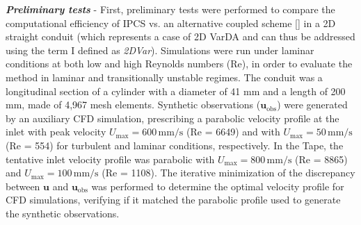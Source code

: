 \label{sec:bench}
\textbf{\textit{Preliminary tests}} - 
First, preliminary tests were performed to compare the computational efficiency of IPCS vs. an alternative coupled scheme [\cite{Figueroa2006}] in a 2D straight conduit (which represents a case of 2D VarDA and can thus be addressed using the term I defined as \emph{2DVar}). Simulations were run under laminar conditions at both low and high Reynolds numbers (Re), in order to evaluate the method in laminar and transitionally unstable regimes.  
The conduit was a longitudinal section of a cylinder with a diameter of 41 mm and a length of 200 mm, made of 4,967 mesh elements. Synthetic observations (\( \mathbf{u}_{\text{obs}} \)) were generated by an auxiliary CFD simulation, prescribing a parabolic velocity profile at the inlet with peak velocity \( U_{\text{max}} = 600 \, \text{mm/s} \) (Re = 6649) and with \( U_{\text{max}} = 50 \, \text{mm/s} \) (Re = 554) for turbulent and laminar conditions, respectively.
In the Tape, the tentative inlet velocity profile was parabolic with \( U_{\text{max}} = 800 \, \text{mm/s} \) (Re = 8865) and \( U_{\text{max}} = 100 \, \text{mm/s} \) (Re = 1108).
The iterative minimization of the discrepancy between \( \mathbf{u} \) and \( \mathbf{u}_{\text{obs}} \) was performed to determine the optimal velocity profile for CFD simulations, verifying if it matched the parabolic profile used to generate the synthetic observations.\\

%
%
%
%
%

